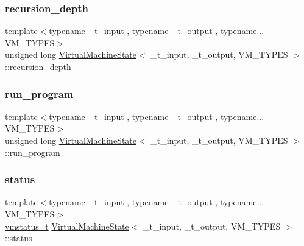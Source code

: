 \mbox{\label{class_virtual_machine_state_aa35593f67d1ea4e838fec8e7a8d33897}} 
\subsubsection{\texorpdfstring{recursion\+\_\+depth}{recursion\_depth}}
{\footnotesize\ttfamily template$<$typename \+\_\+t\+\_\+input , typename \+\_\+t\+\_\+output , typename... V\+M\+\_\+\+T\+Y\+P\+ES$>$ \\
unsigned long \hyperlink{class_virtual_machine_state}{Virtual\+Machine\+State}$<$ \+\_\+t\+\_\+input, \+\_\+t\+\_\+output, V\+M\+\_\+\+T\+Y\+P\+ES $>$\+::recursion\+\_\+depth}

\mbox{\label{class_virtual_machine_state_afc2691c3bd3c7c3feba0708c2929ffe2}} 
\subsubsection{\texorpdfstring{run\+\_\+program}{run\_program}}
{\footnotesize\ttfamily template$<$typename \+\_\+t\+\_\+input , typename \+\_\+t\+\_\+output , typename... V\+M\+\_\+\+T\+Y\+P\+ES$>$ \\
unsigned long \hyperlink{class_virtual_machine_state}{Virtual\+Machine\+State}$<$ \+\_\+t\+\_\+input, \+\_\+t\+\_\+output, V\+M\+\_\+\+T\+Y\+P\+ES $>$\+::run\+\_\+program}

\mbox{\label{class_virtual_machine_state_a6e561a217081654b4187620953e86fff}} 
\subsubsection{\texorpdfstring{status}{status}}
{\footnotesize\ttfamily template$<$typename \+\_\+t\+\_\+input , typename \+\_\+t\+\_\+output , typename... V\+M\+\_\+\+T\+Y\+P\+ES$>$ \\
\hyperlink{_instruction_8h_a6202215407ab29590bb936ca2996cf64}{vmstatus\+\_\+t} \hyperlink{class_virtual_machine_state}{Virtual\+Machine\+State}$<$ \+\_\+t\+\_\+input, \+\_\+t\+\_\+output, V\+M\+\_\+\+T\+Y\+P\+ES $>$\+::status}

